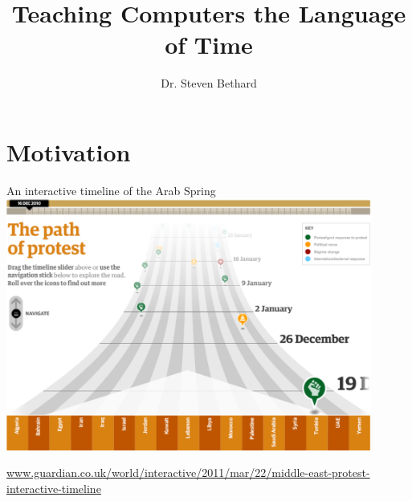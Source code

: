 \documentclass[12pt,compress]{beamer}
\title[\url{http://bethard.faculty.arizona.edu/}]{Teaching Computers the Language of Time}
\author[Dr. Bethard]{Dr. Steven Bethard}
\institute[UA iSchool]{%
School of Information\\
University of Arizona}
\date{\texttoday}
\begin{document}
\section{Motivation}


\begin{frame}[plain]
  \titlepage
\end{frame}


\begin{frame}{An interactive timeline of the Arab Spring}
\includegraphics[width=0.9\textwidth]{arab-spring}

{\tiny\url{www.guardian.co.uk/world/interactive/2011/mar/22/middle-east-protest-interactive-timeline}}
\end{frame}
\end{document}
